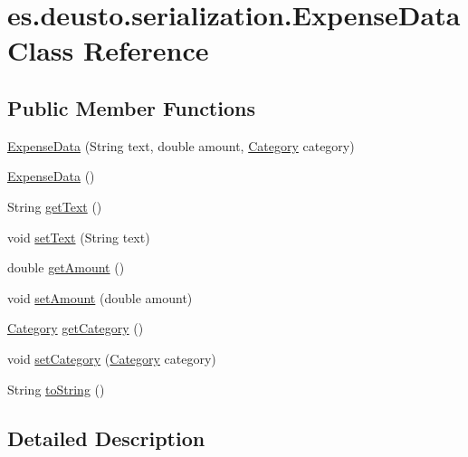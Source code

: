 \hypertarget{classes_1_1deusto_1_1serialization_1_1_expense_data}{}\section{es.\+deusto.\+serialization.\+Expense\+Data Class Reference}
\label{classes_1_1deusto_1_1serialization_1_1_expense_data}
\subsection*{Public Member Functions}
\begin{DoxyCompactItemize}
\item 
\hyperlink{classes_1_1deusto_1_1serialization_1_1_expense_data_ae84c88e2ce6f4dbe911a133c7bc63b36}{Expense\+Data} (String text, double amount, \hyperlink{enumes_1_1deusto_1_1server_1_1jdo_1_1_category}{Category} category)
\item 
\hyperlink{classes_1_1deusto_1_1serialization_1_1_expense_data_a97e68a5653ec71fa336e830b5b6615c3}{Expense\+Data} ()
\item 
String \hyperlink{classes_1_1deusto_1_1serialization_1_1_expense_data_a093995ac1e4a4e3e85c9c46ec739515d}{get\+Text} ()
\item 
void \hyperlink{classes_1_1deusto_1_1serialization_1_1_expense_data_ae9cc50bc7eddb9ff751f5bb9a02eb0d4}{set\+Text} (String text)
\item 
double \hyperlink{classes_1_1deusto_1_1serialization_1_1_expense_data_a9b0652de8009eca9d315aa0d041138a2}{get\+Amount} ()
\item 
void \hyperlink{classes_1_1deusto_1_1serialization_1_1_expense_data_a9e78d6a6acc6fc0fd05f28a09432caf2}{set\+Amount} (double amount)
\item 
\hyperlink{enumes_1_1deusto_1_1server_1_1jdo_1_1_category}{Category} \hyperlink{classes_1_1deusto_1_1serialization_1_1_expense_data_aa53e9ee1ef7220a272b043e475f504f1}{get\+Category} ()
\item 
void \hyperlink{classes_1_1deusto_1_1serialization_1_1_expense_data_a54bbe919419f8750caaed58a09d2b326}{set\+Category} (\hyperlink{enumes_1_1deusto_1_1server_1_1jdo_1_1_category}{Category} category)
\item 
String \hyperlink{classes_1_1deusto_1_1serialization_1_1_expense_data_a89e0bc878ddf158ee69e56f26d0aa8e0}{to\+String} ()
\end{DoxyCompactItemize}


\subsection{Detailed Description}


